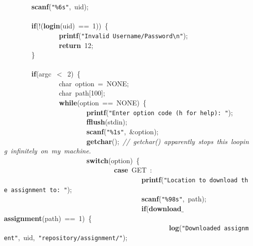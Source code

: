 \mbox{}\ \ \ \ \ \ \ \ \textbf{scanf}(\texttt{"{}\%6s"{}},\ uid); \\
\mbox{}\ \ \ \ \ \ \ \  \\
\mbox{}\ \ \ \ \ \ \ \ \textbf{if}(!(\textbf{login}(uid)\ ==\ 1))\ \{ \\
\mbox{}\ \ \ \ \ \ \ \ \ \ \ \ \ \ \ \ \textbf{printf}(\texttt{"{}Invalid\ Username/Password}\texttt{\textbackslash{}n}\texttt{"{}}); \\
\mbox{}\ \ \ \ \ \ \ \ \ \ \ \ \ \ \ \ \textbf{return}\ 12; \\
\mbox{}\ \ \ \ \ \ \ \ \} \\
\mbox{} \\
\mbox{}\ \ \ \ \ \ \ \ \textbf{if}(argc\ $<$\ 2)\ \{ \\
\mbox{}\ \ \ \ \ \ \ \ \ \ \ \ \ \ \ \ char\ option\ =\ NONE; \\
\mbox{}\ \ \ \ \ \ \ \ \ \ \ \ \ \ \ \ char\ path[100]; \\
\mbox{}\ \ \ \ \ \ \ \ \ \ \ \ \ \ \ \ \textbf{while}(option\ ==\ NONE)\ \{ \\
\mbox{}\ \ \ \ \ \ \ \ \ \ \ \ \ \ \ \ \ \ \ \ \ \ \ \ \textbf{printf}(\texttt{"{}Enter\ option\ code\ (h\ for\ help):\ "{}}); \\
\mbox{}\ \ \ \ \ \ \ \ \ \ \ \ \ \ \ \ \ \ \ \ \ \ \ \ \textbf{fflush}(stdin); \\
\mbox{}\ \ \ \ \ \ \ \ \ \ \ \ \ \ \ \ \ \ \ \ \ \ \ \ \textbf{scanf}(\texttt{"{}\%1s"{}},\ \&option); \\
\mbox{}\ \ \ \ \ \ \ \ \ \ \ \ \ \ \ \ \ \ \ \ \ \ \ \ \textbf{getchar}();\ \textit{//\ getchar()\ apparently\ stops\ this\ looping\ infinitely\ on\ my\ machine.} \\
\mbox{}\ \ \ \ \ \ \ \ \ \ \ \ \ \ \ \ \ \ \ \ \ \ \ \ \textbf{switch}(option)\ \{ \\
\mbox{}\ \ \ \ \ \ \ \ \ \ \ \ \ \ \ \ \ \ \ \ \ \ \ \ \ \ \ \ \ \ \ \ \textbf{case}\ GET\ : \\
\mbox{}\ \ \ \ \ \ \ \ \ \ \ \ \ \ \ \ \ \ \ \ \ \ \ \ \ \ \ \ \ \ \ \ \ \ \ \ \ \ \ \ \textbf{printf}(\texttt{"{}Location\ to\ download\ the\ assignment\ to:\ "{}}); \\
\mbox{}\ \ \ \ \ \ \ \ \ \ \ \ \ \ \ \ \ \ \ \ \ \ \ \ \ \ \ \ \ \ \ \ \ \ \ \ \ \ \ \ \textbf{scanf}(\texttt{"{}\%98s"{}},\ path); \\
\mbox{}\ \ \ \ \ \ \ \ \ \ \ \ \ \ \ \ \ \ \ \ \ \ \ \ \ \ \ \ \ \ \ \ \ \ \ \ \ \ \ \ \textbf{if}(\textbf{download$\_$assignment}(path)\ ==\ 1)\ \{ \\
\mbox{}\ \ \ \ \ \ \ \ \ \ \ \ \ \ \ \ \ \ \ \ \ \ \ \ \ \ \ \ \ \ \ \ \ \ \ \ \ \ \ \ \ \ \ \ \ \ \ \ \textbf{log}(\texttt{"{}Downloaded\ assignment"{}},\ uid,\ \texttt{"{}repository/assignment/"{}}); \\
